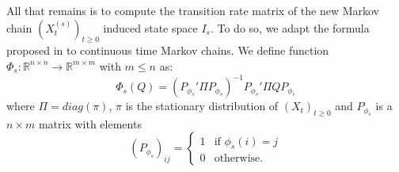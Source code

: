All that remains is to compute the transition rate matrix of the new Markov chain $(X_t^{(s)})_{t \ge 0}$ induced  state space $I_s$. To do so, we adapt the formula proposed in \cite{5746509} to continuous time Markov chains. We define function $\Phi_s: \mathbb{R}^{n \times n} \rightarrow \mathbb{R}^{m \times m}$ with $m \le n$ as:
\begin{equation}
	\label{eq:ctmc-state-aggregation}
	\Phi_s(Q) = (P_{\phi_s}' \Pi P_{\phi_s})^{-1} P_{\phi_s}' \Pi Q P_{\phi_s}
\end{equation}
where $\Pi = diag(\pi)$, $\pi$ is the stationary distribution of $(X_t)_{t \ge 0}$ and $P_{\phi_s}$ is a 
$n \times m$ matrix with elements
\begin{equation}
	\nonumber
	\left(P_{\phi_s}\right)_{ij} = 
		\left\{
			\begin{array}{ll}
				1 & \mbox{if } \phi_s(i) = j \\
				0 & \mbox{otherwise}.
			\end{array}
		\right.
\end{equation}




